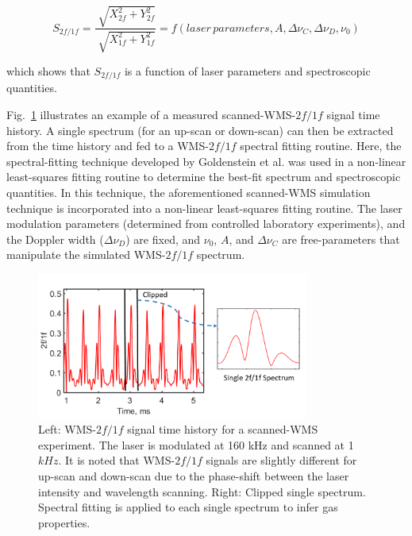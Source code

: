 \begin{equation}\label{eq:ch3_25}
S_{2f/1f}=\frac{\sqrt[]{X_{2f}^2+Y_{2f}^2}}{\sqrt[]{X_{1f}^2+Y_{1f}^2}}=f(laser\,parameters,A,\Delta\nu_C,\Delta\nu_D,\nu_0)
\end{equation}

\vspace{3mm}
\noindent which shows that $S_{2f/1f}$ is a function of laser parameters and spectroscopic quantities.


Fig.\ \ref{fig:ch3_4} illustrates an example of a measured scanned-WMS-$2f/1f$ signal time history. A single spectrum (for an up-scan or down-scan) can then be extracted from the time history and fed to a WMS-$2f/1f$ spectral fitting routine. Here, the spectral-fitting technique developed by Goldenstein et al. \cite{Goldenstein2017} was used in a non-linear least-squares fitting routine to determine the best-fit spectrum and spectroscopic quantities. In this technique, the aforementioned scanned-WMS simulation technique is incorporated into a non-linear least-squares fitting routine. The laser modulation parameters (determined from controlled laboratory experiments), and the Doppler width ($\Delta\nu_D$) are fixed, and $\nu_0$, $A$, and $\Delta\nu_C$ are free-parameters that manipulate the simulated WMS-$2f/1f$ spectrum. 

 \begin{figure}[h]
    \centering
        \includegraphics[trim = 0mm 0mm 0mm 0mm, clip=true, width=0.8\textwidth]{fig/ch3_fig6.png}
        \caption{Left: WMS-$2f/1f$ signal time history for a scanned-WMS experiment. The laser is modulated at 160 kHz and scanned at 1 $kHz$. It is noted that WMS-$2f/1f$ signals are slightly different for up-scan and down-scan due to the phase-shift between the laser intensity and wavelength scanning. Right: Clipped single spectrum. Spectral fitting is applied to each single spectrum to infer gas properties.}
    \label{fig:ch3_4}
\end{figure}

